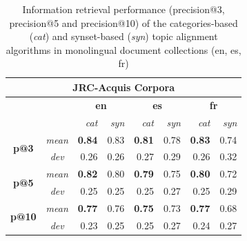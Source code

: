 \begin{table}[ht]\centering
\begin{center}
\small
\begin{tabular}{cc|rr||rr||rr}
    \hline
    \multicolumn{8}{c}{\textbf{JRC-Acquis Corpora}} \\
    \hline
    & & \multicolumn{2}{c}{\textbf{en}} &
      \multicolumn{2}{c}{\textbf{es}} &
      \multicolumn{2}{c}{\textbf{fr}} \\
    & & {\textit{cat}} & {\textit{syn}} & {\textit{cat}} & {\textit{syn}} & {\textit{cat}} & {\textit{syn}} \\
    \hline
    \multirow{2}{*}{\textbf{p@3}} 
    &{\textit{mean}}    &\textbf{0.84} &0.83 &\textbf{0.81} &0.78 &\textbf{0.83} &0.74 \\
    &{\textit{dev}}     &0.26 &0.26 &0.27 &0.29 &0.26 &0.32 \\
    \hline
    \multirow{2}{*}{\textbf{p@5}} 
    &{\textit{mean}}    &\textbf{0.82} &0.80 &\textbf{0.79} &0.75 &\textbf{0.80} &0.72 \\
    &{\textit{dev}}     &0.25 &0.25 &0.25 &0.27 &0.25 &0.29 \\
    \hline
    \multirow{2}{*}{\textbf{p@10}} 
    &{\textit{mean}}    &\textbf{0.77} &0.76 &\textbf{0.75} &0.73 &\textbf{0.77} &0.68 \\
    &{\textit{dev}}     &0.23 &0.25 &0.25 &0.27 &0.24 &0.27 \\
\end{tabular}
\end{center}
\caption{Information retrieval performance (precision@3, precision@5 and precision@10) of the categories-based (\textit{cat}) and synset-based (\textit{syn}) topic alignment algorithms in monolingual document collections (en, es, fr)}
\label{tb:mono-ir}
\end{table}

